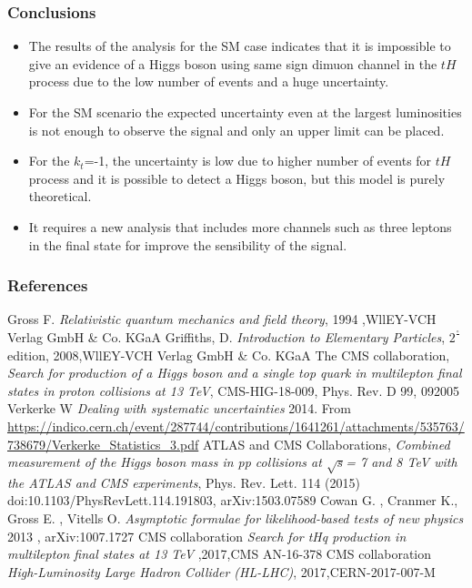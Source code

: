 \documentclass[11pt]{beamer}
\begin{document}
\begin{frame}
\frametitle{Conclusions}
\begin{itemize}
\item The results of the analysis for the SM case indicates that it is impossible to give an evidence of a Higgs boson using same sign dimuon channel in the $tH$ process due to the low number of events and a huge uncertainty.
\item For the SM scenario the expected uncertainty even at the largest luminosities is not enough to observe the signal and only an upper limit can be placed.
\item For the $k_t$=-1, the uncertainty is low due to higher number of events for $tH$ process and it is possible to detect a Higgs boson, but this model is purely theoretical.
\item It requires a new analysis that includes more channels such as three leptons in the final state for improve the sensibility of the signal.
\end{itemize}
\end{frame}


	\begin{thebibliography}{99}
		
	\begin{frame}
	\tiny
	\frametitle{References}
	
	Gross F. \textit{Relativistic quantum mechanics and field theory}, 1994 ,WllEY-VCH Verlag GmbH \& Co. KGaA
	 Griffiths, D. \textit{Introduction to Elementary Particles}, $2^\frac{\circ}{}$ edition, 2008,WllEY-VCH Verlag GmbH \& Co. KGaA
		The CMS collaboration, \textit{Search for production of a Higgs boson and a single top
	quark in multilepton final states in proton collisions at 13 TeV}, CMS-HIG-18-009, Phys. Rev. D 99, 092005
	Verkerke W \textit{Dealing with systematic uncertainties} 2014. From
\url{https://indico.cern.ch/event/287744/contributions/1641261/attachments/535763/738679/Verkerke_Statistics_3.pdf}
 ATLAS and CMS
Collaborations, \textit{Combined measurement of the Higgs boson mass in
	pp collisions at $\sqrt{s}$= 7 and 8 TeV with the ATLAS and CMS experiments}, Phys. Rev. Lett.
114 (2015) doi:10.1103/PhysRevLett.114.191803, arXiv:1503.07589
 Cowan G. , Cranmer K., Gross E. , Vitells O.\textit{ Asymptotic formulae for
	likelihood-based tests of new physics} 2013 , arXiv:1007.1727
CMS collaboration \textit{Search for tHq production in multilepton final states at 13 TeV} ,2017,CMS AN-16-378
CMS collaboration \textit{High-Luminosity Large Hadron Collider (HL-LHC)}, 2017,CERN-2017-007-M
\end{frame}
\end{thebibliography}
\end{document}
